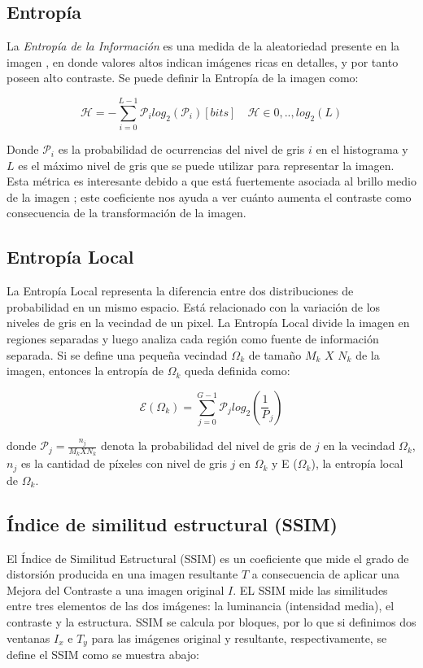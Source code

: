 \documentclass[spanish,twocolumn]{article}
\begin{document}
\subsection{Entropía}
\label{ssec:entropia}

La {\it Entropía de la Información} es una medida de la aleatoriedad presente en la imagen \cite{tsai2008information}, en donde valores altos indican imágenes ricas en detalles, y por tanto poseen alto contraste. Se puede definir la Entropía de la imagen como: 

\begin{equation}\label{eq:entropia}
\mathscr{H}=-\sum_{i=0}^{L-1}\mathcal{P}_i log_2(\mathcal{P}_i) [bits] \quad \mathscr{H} \in {0,..,log_2(L)} 
\end{equation}

Donde $\mathcal{P}_i$ es la probabilidad de ocurrencias del nivel de gris $i$ en el histograma y $L$ es el máximo nivel de gris que se puede utilizar para representar la imagen. Esta métrica es interesante debido a que está fuertemente asociada al brillo medio de la imagen \cite{108593}; este coeficiente nos ayuda a ver cuánto aumenta el contraste como consecuencia de la transformación de la imagen.


\subsection{Entropía Local}
\label{ssec:entropialocal}
La Entropía Local \cite{localentropy} representa la diferencia entre dos distribuciones de probabilidad en un mismo espacio. Está relacionado con la variación de los niveles de gris en la vecindad de un pixel. La Entropía Local divide la imagen en regiones separadas y luego analiza cada región como fuente de información separada.
Si se define una pequeña vecindad $\Omega_k$ de tamaño $M_k$ $X$ $N_k$ de la imagen, entonces la entropía de $\Omega_k$ queda definida como:

\begin{equation}\label{eq:entropialocal}
 \mathscr E{(\Omega_k)}=\sum_{j=0}^{G-1}\mathcal P_j log_2(\frac{1}{P}_j)
\end{equation}

donde $\mathcal P_j=\frac{n_j}{M_k X N_k}$ denota la probabilidad del nivel de gris de $j$ en la vecindad  $\Omega_k$, $n_j$ es la cantidad de píxeles con nivel de gris $j$ en  $\Omega_k$ y E ($\Omega_k$), la entropía local de  $\Omega_k$.

\subsection{Índice de similitud estructural (SSIM)}
\label{ssec:ssim}
El {Índice de Similitud Estructural (SSIM)} \cite{wang2004image} es un coeficiente que mide el grado de distorsión producida en una imagen resultante $T$ a consecuencia de aplicar una Mejora del Contraste a una imagen original $I$. 
EL SSIM mide las similitudes entre tres elementos de las dos imágenes: la luminancia (intensidad media), el contraste y la estructura. SSIM se calcula por bloques, por lo que si definimos dos ventanas $I_x$ e $T_y$ para las imágenes original y resultante, respectivamente, se define el SSIM como se muestra abajo:
\end{document}

